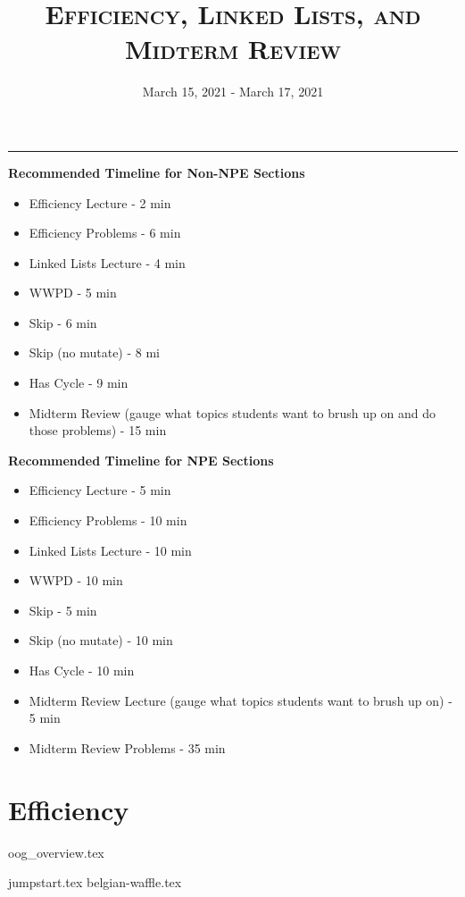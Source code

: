 \documentclass{exam}
\title{\textsc{Efficiency, Linked Lists, and Midterm Review}}
\date{March 15, 2021 - March 17, 2021}
\begin{document}
\maketitle
\rule{\textwidth}{0.15em}
\fontsize{12}{15}\selectfont

\begin{guide}
\textbf{Recommended Timeline for Non-NPE Sections}
\begin{itemize}
    \item Efficiency Lecture - 2 min
    \item Efficiency Problems - 6 min
    \item Linked Lists Lecture - 4 min
    \item WWPD - 5 min
    \item Skip - 6 min
    \item Skip (no mutate) - 8 mi
    \item Has Cycle - 9 min
    \item Midterm Review (gauge what topics students want to brush up on and do those problems) - 15 min
\end{itemize}
\vspace{.5cm}
\textbf{Recommended Timeline for NPE Sections}
\begin{itemize}
    \item Efficiency Lecture - 5 min
    \item Efficiency Problems - 10 min
    \item Linked Lists Lecture - 10 min
    \item WWPD - 10 min
    \item Skip - 5 min
    \item Skip (no mutate) - 10 min
    \item Has Cycle - 10 min
    \item Midterm Review Lecture (gauge what topics students want to brush up on) - 5 min
    \item Midterm Review Problems - 35 min
\end{itemize}
\end{guide}

\section{Efficiency}
{oog_overview.tex}
\begin{questions}
{jumpstart.tex}
{belgian-waffle.tex}
\end{questions}
\end{document}
